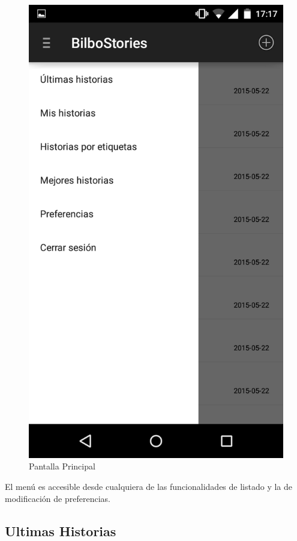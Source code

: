 \documentclass[11pt,a4paper, titlepage]{article}
\begin{document}
	\begin{figure}[hbtp]
		\centering
		\includegraphics[scale = 0.25 ]{img/3}
		\caption{Pantalla Principal}
		\label{p1}
	\end{figure}
	
	El menú es accesible desde cualquiera de las funcionalidades de listado y la de modificación de preferencias.
	
	\FloatBarrier
	\subsection[Ultimas Historias]{Ultimas Historias}
	
\end{document}
